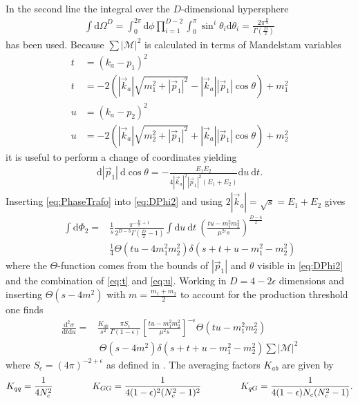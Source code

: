 In the second line the integral over the $D$-dimensional hypersphere 
\begin{align}
\int \mathrm{d}\Omega^D = \int_0^{2\pi} \mathrm{d}\phi \prod_{i=1}^{D-2}\int_0^\pi \sin^i\theta_i \mathrm{d}\theta_i = \frac{2\pi^{\frac{D}{2}}}{\Gamma(\frac{D}{2})}
\end{align}
has been used. Because $\sum|\mathcal{M}|^2$ is calculated in terms of Mandelstam variables 
\begin{align}
t &= (k_a-p_1)^2  \nonumber\\
t &= -2\left(|\vec{k}_a| \sqrt{m_1^2 + |\vec{p}_1|^2} - |\vec{k}_a||\vec{p}_1| \cos\theta\right) + m_1^2\label{eq:t} \\
u &= (k_a-p_2)^2\nonumber\\
u &= -2\left(|\vec{k}_a| \sqrt{m_2^2 + |\vec{p}_1|^2} + |\vec{k}_a||\vec{p}_1| \cos\theta\right) + m_2^2\label{eq:u}
\end{align}
it is useful to perform a change of coordinates yielding
\begin{align}
\mathrm{d}|\vec{p}_1|\ \mathrm{d}\cos\theta = -\frac{E_1 E_2}{4|\vec{k}_a|^2|\vec{p}_1|^2(E_1+E_2)}\mathrm{d}u\ \mathrm{d}t.\label{eq:PhaseTrafo}
\end{align}
Inserting \ref{eq:PhaseTrafo} into \ref{eq:DPhi2} and using $2|\vec{k}_a| = \sqrt{s} = E_1 + E_2$ gives
\begin{align}
\int \mathrm{d}\Phi_2 = & \frac{1}{s} \frac{\pi^{-\frac{D}{2}+1}}{2^{D-3}\Gamma(\frac{D}{2}-1)} \int \mathrm{d}u\ \mathrm{d}t\ \left( \frac{tu-m_1^2m_2^2}{\mu^{2\epsilon} s} \right)^{\frac{D-4}{2}} \nonumber\\
&\frac{1}{4}\Theta(tu-4m_1^2m_2^2)\delta \left(s+t+u-m_1^2-m_2^2\right)
\end{align}
where the $\Theta$-function comes from the bounds of $|\vec{p}_1|$ and $\theta$ visible in \ref{eq:DPhi2} and the combination of \ref{eq:t} and \ref{eq:u}. Working in $D=4-2\epsilon$ dimensions and inserting $\Theta(s-4m^2)$ with $m = \frac{m_1 + m_2}{2}$ to account for the production threshold one finds
\begin{align}
\frac{\mbox{d}^2 \sigma}{\mbox{d}t\mbox{d}u} =& \frac{K_{ab}}{s^2} \frac{\pi S_{\epsilon}}{\Gamma(1-\epsilon)} \left[ \frac{tu-m_1^2m_2^2}{\mu^2 s}\right]^{-\epsilon} \Theta(tu-m_1^2m_2^2)\nonumber\\
&\ \Theta(s-4m^2) \delta(s+t+u-m_1^2-m_2^2) \sum |\mathcal{M}|^2
\end{align}
where $S_\epsilon = (4\pi)^{-2+\epsilon}$ as defined in \cite{Beenakker:1996ch}.
The averaging factors $K_{ab}$ are given by
\begin{align}
K_{qq} = \frac{1}{4N_c^2} \hspace{1.5cm}K_{GG} = \frac{1}{4(1-\epsilon)^2(N_c^2-1)^2} \hspace{1.5cm}K_{qG} = \frac{1}{4(1-\epsilon)N_c(N_c^2-1)}.
\end{align}

